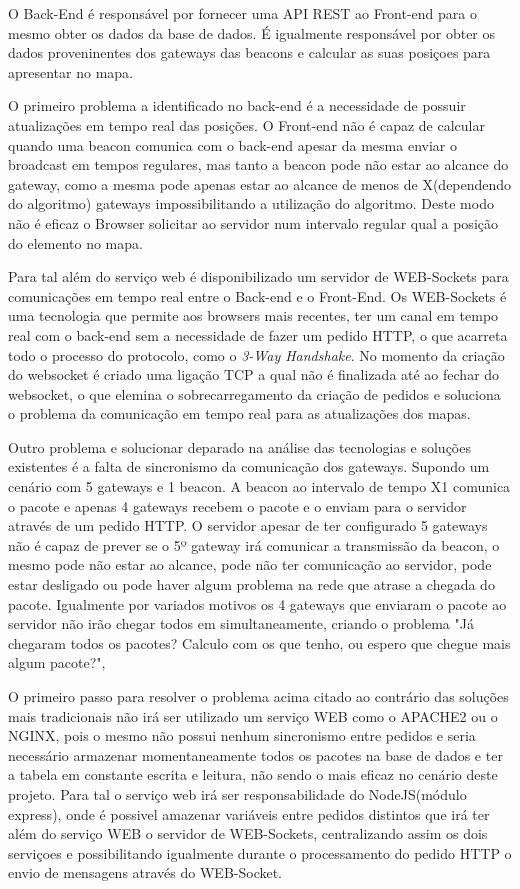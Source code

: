 \par O Back-End é responsável por fornecer uma API REST ao Front-end para o mesmo obter os dados da base de dados. É igualmente responsável por obter os dados proveninentes dos gateways das beacons e calcular as suas posiçoes para apresentar no mapa. 
\par O primeiro problema a identificado no back-end é a necessidade de possuir atualizações em tempo real das posições. O Front-end não é capaz de calcular quando uma beacon comunica com o back-end apesar da mesma enviar o broadcast em tempos regulares, mas tanto a beacon  pode não estar ao alcance do gateway, como a mesma pode apenas estar ao alcance de menos de X(dependendo do algoritmo) gateways impossibilitando a utilização do algoritmo. Deste modo não é eficaz o Browser solicitar ao servidor num intervalo regular qual a posição do elemento no mapa.
\par Para tal além do serviço web é disponibilizado um servidor de WEB-Sockets para comunicações em tempo real entre o Back-end e o Front-End. Os WEB-Sockets é uma tecnologia que permite aos browsers mais recentes, ter um canal em tempo real com o back-end sem a necessidade de fazer um pedido HTTP, o que acarreta todo o processo do protocolo, como o \textit{3-Way Handshake}. No momento da criação do websocket é criado uma ligação TCP a qual não é finalizada até ao fechar do websocket, o que elemina o sobrecarregamento da criação de pedidos e soluciona o problema da comunicação em tempo real para as atualizações dos mapas.
\par Outro problema e solucionar deparado na análise das tecnologias e soluções existentes é a falta de sincronismo da comunicação dos gateways. Supondo um cenário com 5 gateways e 1 beacon. A beacon ao intervalo de tempo X1 comunica o pacote e apenas 4 gateways recebem o pacote e o enviam para o servidor através de um pedido HTTP. O servidor apesar de ter configurado 5 gateways não é capaz de prever se o 5º gateway irá comunicar a transmissão da beacon, o mesmo pode não estar ao alcance, pode não ter comunicação ao servidor, pode estar desligado ou pode haver algum problema na rede que atrase a chegada do pacote. Igualmente por variados motivos os 4 gateways que enviaram o pacote ao servidor não irão chegar todos em simultaneamente, criando o problema "Já chegaram todos os pacotes? Calculo com os que tenho, ou espero que chegue mais algum pacote?",
\par O primeiro passo para resolver o problema acima citado ao contrário das soluções mais tradicionais não irá ser utilizado um serviço WEB como o APACHE2 ou o NGINX, pois o mesmo não possui nenhum sincronismo entre pedidos e seria necessário armazenar momentaneamente todos os pacotes na base de dados e ter a tabela em constante escrita e leitura, não sendo o mais eficaz no cenário deste projeto. Para tal o serviço web irá ser responsabilidade do NodeJS(módulo express), onde é possivel amazenar variáveis entre pedidos distintos que irá ter além do serviço WEB o servidor de WEB-Sockets, centralizando assim os dois serviçoes e possibilitando igualmente durante o processamento do pedido HTTP o envio de mensagens através do WEB-Socket. 
